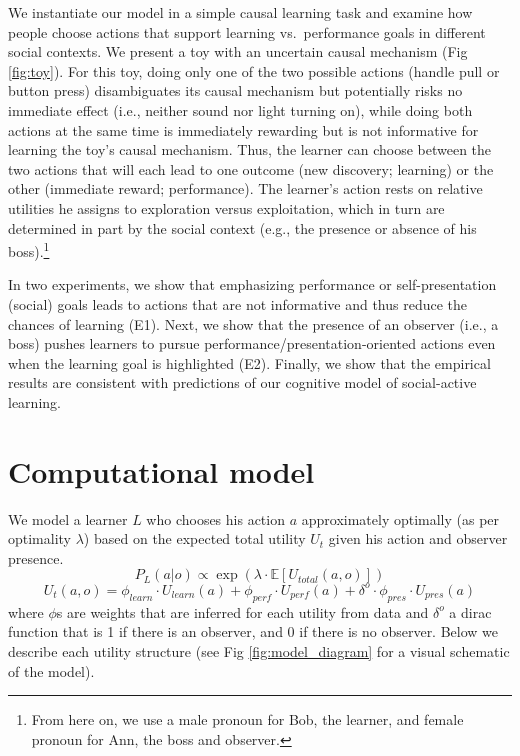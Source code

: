 \documentclass[10pt, letterpaper]{article}
\begin{document}
We instantiate our model in a simple causal learning task and examine
how people choose actions that support learning vs.~performance goals in
different social contexts. We present a toy with an uncertain causal
mechanism (Fig \ref{fig:toy}). For this toy, doing only one of the two
possible actions (handle pull or button press) disambiguates its causal
mechanism but potentially risks no immediate effect (i.e., neither sound
nor light turning on), while doing both actions at the same time is
immediately rewarding but is not informative for learning the toy's
causal mechanism. Thus, the learner can choose between the two actions
that will each lead to one outcome (new discovery; learning) or the
other (immediate reward; performance). The learner's action rests on
relative utilities he assigns to exploration versus exploitation, which
in turn are determined in part by the social context (e.g., the presence
or absence of his
boss).\footnote{From here on, we use a male pronoun for Bob, the learner, and female pronoun for Ann, the boss and observer.}

In two experiments, we show that emphasizing performance or
self-presentation (social) goals leads to actions that are not
informative and thus reduce the chances of learning (E1). Next, we show
that the presence of an observer (i.e., a boss) pushes learners to
pursue performance/presentation-oriented actions even when the learning
goal is highlighted (E2). Finally, we show that the empirical results
are consistent with predictions of our cognitive model of social-active
learning.

\section{Computational model}\label{computational-model}

We model a learner \(L\) who chooses his action \(a\) approximately
optimally (as per optimality \(\lambda\)) based on the expected total
utility \(U_{t}\) given his action and observer presence.
\[ P_L(a | o) \propto \exp(\lambda \cdot \mathbb{E}[U_{total}(a,o)])\]
\[U_{t}(a,o) = \phi_{learn} \cdot U_{learn}(a) + \phi_{perf} \cdot U_{perf}(a) + \delta^o \cdot \phi_{pres} \cdot U_{pres}(a)\]
\noindent
where \(\phi\)s are weights that are inferred for each utility from data
and \(\delta^o\) a dirac function that is 1 if there is an observer, and
0 if there is no observer. Below we describe each utility structure (see
Fig \ref{fig:model_diagram} for a visual schematic of the model).
\end{document}
